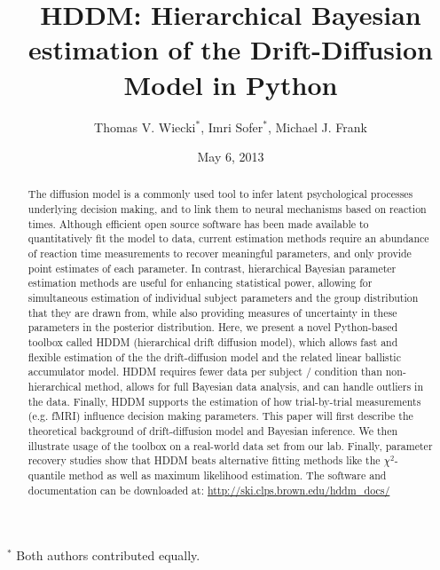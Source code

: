 \documentclass[letterpaper,10pt,english]{article}
\title{HDDM: Hierarchical Bayesian estimation of the Drift-Diffusion
Model in Python}
\date{May 6, 2013}
\author{Thomas V. Wiecki$^\ast$, Imri Sofer$^\ast$, Michael J. Frank}
\begin{document}
\maketitle

$^\ast$ Both authors contributed equally.
\begin{abstract}
\label{abstract:abstract}
The diffusion model is a commonly used tool to infer latent
psychological processes underlying decision making, and to link them
to neural mechanisms based on reaction times. Although efficient open
source software has been made available to quantitatively fit the
model to data, current estimation methods require an abundance of
reaction time measurements to recover meaningful parameters, and only
provide point estimates of each parameter.  In contrast, hierarchical
Bayesian parameter estimation methods are useful for enhancing
statistical power, allowing for simultaneous estimation of individual
subject parameters and the group distribution that they are drawn
from, while also providing measures of uncertainty in these parameters
in the posterior distribution. Here, we present a novel Python-based
toolbox called HDDM (hierarchical drift diffusion model), which allows
fast and flexible estimation of the the drift-diffusion model and the
related linear ballistic accumulator model. HDDM requires fewer data
per subject / condition than non-hierarchical method, allows for full
Bayesian data analysis, and can handle outliers in the data.  Finally,
HDDM supports the estimation of how trial-by-trial measurements (e.g.
fMRI) influence decision making parameters. This paper will first
describe the theoretical background of drift-diffusion model and
Bayesian inference. We then illustrate usage of the toolbox on a
real-world data set from our lab. Finally, parameter recovery studies
show that HDDM beats alternative fitting methods like the
$\chi^2$-quantile method as well as maximum likelihood estimation. The
software and documentation can be downloaded at:
\href{http://ski.clps.brown.edu/hddm\_docs/}{http://ski.clps.brown.edu/hddm\_docs/}
\end{abstract}

\end{document}
